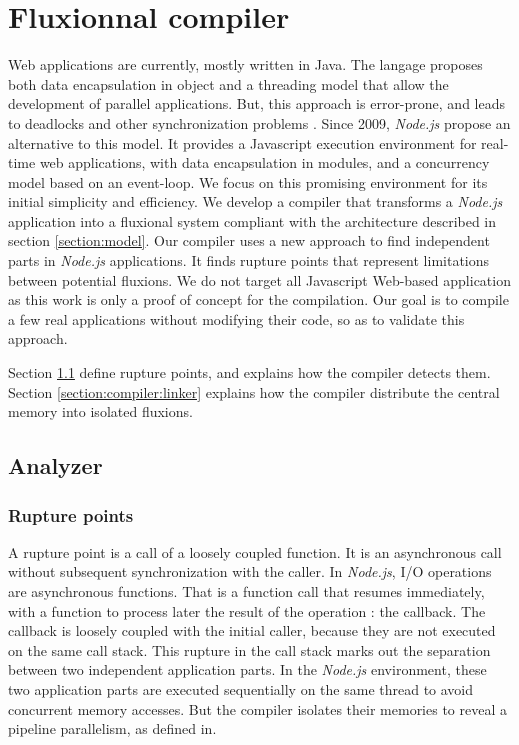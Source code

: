 \section{Fluxionnal compiler} \label{section:compiler}

Web applications are currently, mostly written in Java.
The langage proposes both data encapsulation in object and a threading model that allow the development of parallel applications.
But, this approach is error-prone, and leads to deadlocks and other synchronization problems \cite{Adya2002}.
Since 2009, \textit{Node.js}\cite{Dahl} propose an alternative to this model.
It provides a Javascript execution environment for real-time web applications, with data encapsulation in modules, and a concurrency model based on an event-loop.
We focus on this promising environment for its initial simplicity and efficiency.
We develop a compiler that transforms a \textit{Node.js} application into a fluxional system compliant with the architecture described in section \ref{section:model}.
Our compiler uses a new approach to find independent parts in \textit{Node.js} applications.
It finds rupture points that represent limitations between potential fluxions.
We do not target all Javascript Web-based application as this work is only a proof of concept for the compilation.
Our goal is to compile a few real applications without modifying their code, so as to validate this approach.

Section \ref{section:compiler:analyzer} define rupture points, and explains how the compiler detects them.
Section \ref{section:compiler:linker} explains how the compiler distribute the central memory into isolated fluxions.

\subsection{Analyzer} \label{section:compiler:analyzer}

\subsubsection{Rupture points} \label{section:compiler:analyzer:rupture}

A rupture point is a call of a loosely coupled function.
It is an asynchronous call without subsequent synchronization with the caller.
In \textit{Node.js}, I/O operations are asynchronous functions.
That is a function call that resumes immediately, with a function to process later the result of the operation : the callback.
The callback is loosely coupled with the initial caller, because they are not executed on the same call stack.
This rupture in the call stack marks out the separation between two independent application parts.
In the \textit{Node.js} environment, these two application parts are executed sequentially on the same thread to avoid concurrent memory accesses.
But the compiler isolates their memories to reveal a pipeline parallelism, as defined in\cite{Gordon2006}.

